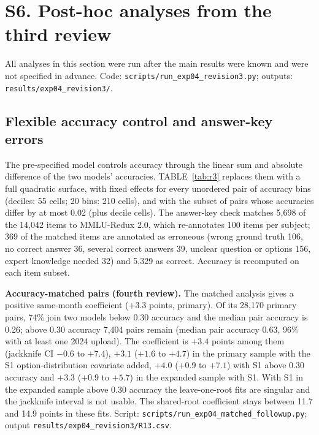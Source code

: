 \documentclass[10pt]{article}
\begin{document}
\section*{S6. Post-hoc analyses from the third review}
All analyses in this section were run after the main results were known and were not specified in advance. Code: \texttt{scripts/run\_exp04\_revision3.py}; outputs: \texttt{results/exp04\_revision3/}.

\subsection*{Flexible accuracy control and answer-key errors}
The pre-specified model controls accuracy through the linear sum and absolute difference of the two models' accuracies. TABLE~\ref{tab:r3} replaces them with a full quadratic surface, with fixed effects for every unordered pair of accuracy bins (deciles: 55 cells; 20 bins: 210 cells), and with the subset of pairs whose accuracies differ by at most 0.02 (plus decile cells). The answer-key check matches 5{,}698 of the 14{,}042 items to MMLU-Redux 2.0, which re-annotates 100 items per subject; 369 of the matched items are annotated as erroneous (wrong ground truth 106, no correct answer 36, several correct answers 39, unclear question or options 156, expert knowledge needed 32) and 5{,}329 as correct. Accuracy is recomputed on each item subset.

\textbf{Accuracy-matched pairs (fourth review).} The matched analysis gives a positive same-month coefficient ($+3.3$ points, primary). Of its 28{,}170 primary pairs, 74\% join two models below 0.30 accuracy and the median pair accuracy is 0.26; above 0.30 accuracy 7{,}404 pairs remain (median pair accuracy 0.63, 96\% with at least one 2024 upload). The coefficient is $+3.4$ points among them (jackknife CI $-0.6$ to $+7.4$), $+3.1$ ($+1.6$ to $+4.7$) in the primary sample with the S1 option-distribution covariate added, $+4.0$ ($+0.9$ to $+7.1$) with S1 above 0.30 accuracy and $+3.3$ ($+0.9$ to $+5.7$) in the expanded sample with S1. With S1 in the expanded sample above 0.30 accuracy the leave-one-root fits are singular and the jackknife interval is not usable. The shared-root coefficient stays between 11.7 and 14.9 points in these fits. Script: \texttt{scripts/run\_exp04\_matched\_followup.py}; output \texttt{results/exp04\_revision3/R13.csv}.

\begin{table}[H]
\caption{\textbf{Accuracy specification and answer-key errors} (post hoc; delete-one-root jackknife 95\% CIs).}
\label{tab:r3}
\centering
\footnotesize
\setlength{\tabcolsep}{2.5pt}
\end{table}
\end{document}
